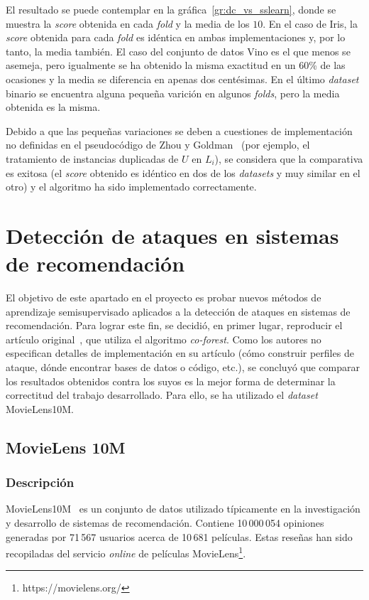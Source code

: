 El resultado se puede contemplar en la gráfica~\ref{gr:dc_vs_sslearn}, donde se muestra la \textit{score} obtenida en cada \textit{fold} y la media de los $10$. En el caso de Iris, la \textit{score} obtenida para cada \textit{fold} es idéntica en ambas implementaciones y, por lo tanto, la media también. El caso del conjunto de datos Vino es el que menos se asemeja, pero igualmente se ha obtenido la misma exactitud en un 60\% de las ocasiones y la media se diferencia en apenas dos centésimas. En el último \textit{dataset} binario se encuentra alguna pequeña varición en algunos \textit{folds}, pero la media obtenida es la misma.

Debido a que las pequeñas variaciones se deben a cuestiones de implementación no definidas en el pseudocódigo de Zhou y Goldman~\cite{democraticCoLearning2004original} (por ejemplo, el tratamiento de instancias duplicadas de $U$ en $L_i$), se considera que la comparativa es exitosa (el \textit{score} obtenido es idéntico en dos de los \textit{datasets} y muy similar en el otro) y el algoritmo ha sido implementado correctamente.


\section{Detección de ataques en sistemas de recomendación}

El objetivo de este apartado en el proyecto es probar nuevos métodos de aprendizaje semisupervisado aplicados a la detección de ataques en sistemas de recomendación. Para lograr este fin, se decidió, en primer lugar, reproducir el artículo original~\cite{zhou2021SemisupervisedRecommendationAttack}, que utiliza el algoritmo \textit{co-forest}. Como los autores no especifican detalles de implementación en su artículo (cómo construir perfiles de ataque, dónde encontrar bases de datos o código, etc.), se concluyó que comparar los resultados obtenidos contra los suyos es la mejor forma de determinar la correctitud del trabajo desarrollado. Para ello, se ha utilizado el \textit{dataset} MovieLens10M.

\subsection{MovieLens 10M}
\subsubsection{Descripción}

MovieLens10M~\cite{groupLensDatasets} es un conjunto de datos utilizado típicamente en la investigación y desarrollo de sistemas de recomendación. Contiene 10\,000\,054 opiniones generadas por 71\,567 usuarios acerca de 10\,681 películas. Estas reseñas han sido recopiladas del servicio \textit{online} de películas MovieLens\footnote{https://movielens.org/}.

